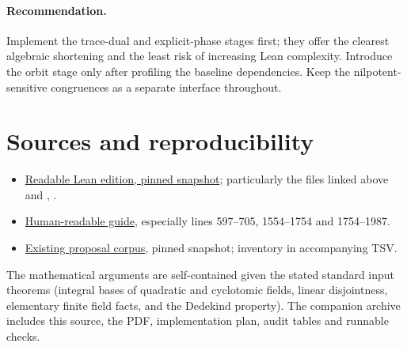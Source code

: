 \documentclass[11pt]{article}
\begin{document}
\paragraph{Recommendation.} Implement the trace-dual and explicit-phase stages first; they offer the clearest algebraic shortening and the least risk of increasing Lean complexity. Introduce the orbit stage only after profiling the baseline dependencies. Keep the nilpotent-sensitive congruences as a separate interface throughout.

\section*{Sources and reproducibility}
\begin{itemize}
\item \href{https://github.com/VladimirReshetnikov/ProveIt/tree/fd695fd462aa31b25af3335e2a9c3b6e014b055f/Analysis/GeneralizedRiemannHypothesis/Lean/grh}{Readable Lean edition, pinned snapshot}; particularly the files linked above and , .
\item \href{https://github.com/VladimirReshetnikov/ProveIt/blob/fd695fd462aa31b25af3335e2a9c3b6e014b055f/Analysis/GeneralizedRiemannHypothesis/docs/guide/theta_lifts_and_dirichlet_zeros.tex}{Human-readable guide}, especially lines 597--705, 1554--1754 and 1754--1987.
\item \href{https://github.com/VladimirReshetnikov/ProveIt/tree/fd695fd462aa31b25af3335e2a9c3b6e014b055f/Analysis/GeneralizedRiemannHypothesis/docs/proposals}{Existing proposal corpus}, pinned snapshot; inventory in accompanying TSV.
\end{itemize}
The mathematical arguments are self-contained given the stated standard input theorems (integral bases of quadratic and cyclotomic fields, linear disjointness, elementary finite field facts, and the Dedekind property). The companion archive includes this source, the PDF, implementation plan, audit tables and runnable checks.
\end{document}
